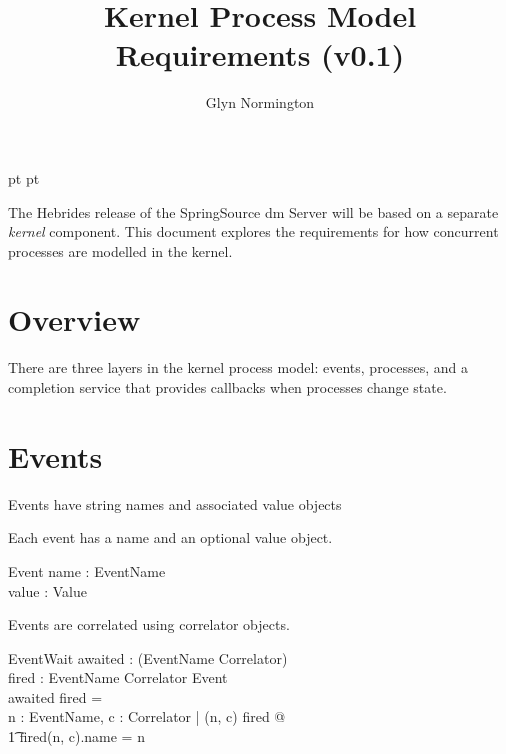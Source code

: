 \documentclass[a4paper]{article}
\begin{document}
 pt
 pt

\title{Kernel Process Model Requirements (v0.1)}
\author{Glyn Normington}
\maketitle
\thispagestyle{myheadings}
\setcounter{page}{0}

The Hebrides release of the SpringSource dm Server will be based on a separate \textit{kernel} component.
This document explores the requirements for how concurrent processes are modelled in the kernel.
\clearpage
{}
\tableofcontents

\newcommand{\true}{true}
\newcommand{\false}{false}
\renewcommand{\empty}{\emptyset}

\clearpage
{}
\section{Overview}

There are three layers in the kernel process model: events, processes, and a completion service that
provides callbacks when processes change state.

\clearpage
\section{Events}

Events have string names and associated value objects
\begin{zed}
\end{zed}

Each event has a name and an optional value object.
\begin{schema}{Event}
name : EventName \\
value : Value \\
\end{schema}

Events are correlated using correlator objects.
\begin{zed}
[Correlator]
\end{zed}
\begin{schema}{EventWait}
 awaited : \power (EventName \cross Correlator) \\
 fired : EventName \cross Correlator \pfun Event \\
\where
 awaited \cap \dom fired = \emptyset \\
  \forall n : EventName, c : Correlator | (n, c) \in \dom fired @\\
 \t1 fired(n, c).name = n \\
\end{schema}
\end{document}
